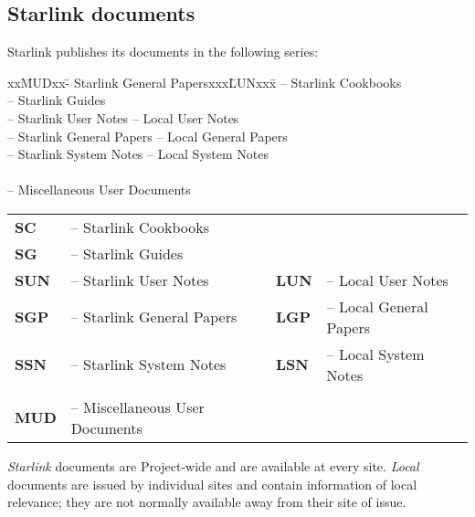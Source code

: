 \documentclass[twoside]{article}
\newcommand{\htmladdnormallink}[2]{#1}
\newenvironment{latexonly}{}{}
\begin{document}
\newpage

\subsection{Starlink documents}

Starlink publishes its
\htmladdnormallink{documents}{http://star-www.rl.ac.uk/docscode.html}
in the following series:

\begin{latexonly}
{\small
\begin{tabbing}
xx\=MUDxx\=- Starlink General Papersxxx\=LUNxx\=x\kill
{}\>-- Starlink Cookbooks\\
\>-- Starlink Guides\\
\>-- Starlink User Notes     \>-- Local User Notes\\
\>-- Starlink General Papers \>-- Local General Papers\\
\>-- Starlink System Notes   \>-- Local System Notes\\
\\
\>-- Miscellaneous User Documents
\end{tabbing}
}
\end{latexonly}

\begin{htmlonly}
\begin{tabular}{llll}
{\bf SC}   & -- Starlink Cookbooks      &           & \\
{\bf SG}   & -- Starlink Guides         &           & \\
{\bf SUN}  & -- Starlink User Notes     & {\bf LUN} & -- Local User Notes\\
{\bf SGP}  & -- Starlink General Papers & {\bf LGP} & -- Local General Papers\\
{\bf SSN}  & -- Starlink System Notes   & {\bf LSN} & -- Local System Notes\\
\\
{\bf MUD}  & -- Miscellaneous User Documents &     &
\end{tabular}
\smallskip
\end{htmlonly}


{\em Starlink}\/ documents are Project-wide and are available at every site.
{\em Local}\/ documents are issued by individual sites and contain information
of local relevance; they are not normally available away from their site of
issue.
\end{document}
